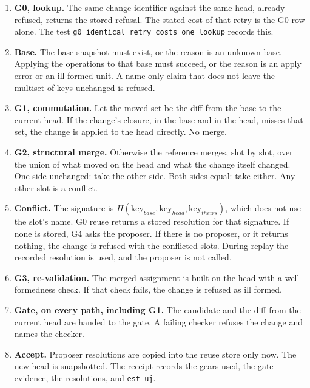 \documentclass[10pt,letterpaper]{article}
\newcounter{none}
\providecommand{\tightlist}{\setlength{\itemsep}{1pt}\setlength{\parskip}{0pt}}
\begin{document}
\begin{enumerate}
\def\labelenumi{\arabic{enumi}.}
\tightlist
\item
  \textbf{G0, lookup.} The same change identifier against the same head,
  already refused, returns the stored refusal. The stated cost of that
  retry is the G0 row alone. The test
  \texttt{g0\_\allowbreak{}identical\_\allowbreak{}retry\_\allowbreak{}costs\_\allowbreak{}one\_\allowbreak{}lookup} records this.
\item
  \textbf{Base.} The base snapshot must exist, or the reason is an
  unknown base. Applying the operations to that base must succeed, or
  the reason is an apply error or an ill-formed unit. A name-only claim
  that does not leave the multiset of keys unchanged is refused.
\item
  \textbf{G1, commutation.} Let the moved set be the diff from the base
  to the current head. If the change's closure, in the base and in the
  head, misses that set, the change is applied to the head directly. No
  merge.
\item
  \textbf{G2, structural merge.} Otherwise the reference merges, slot by
  slot, over the union of what moved on the head and what the change
  itself changed. One side unchanged: take the other side. Both sides
  equal: take either. Any other slot is a conflict.
\item
  \textbf{Conflict.} The signature is
  \(H(\mathrm{key}_{base}, \mathrm{key}_{head}, \mathrm{key}_{theirs})\),
  which does not use the slot's name. G0 reuse returns a stored
  resolution for that signature. If none is stored, G4 asks the
  proposer. If there is no proposer, or it returns nothing, the change
  is refused with the conflicted slots. During replay the recorded
  resolution is used, and the proposer is not called.
\item
  \textbf{G3, re-validation.} The merged assignment is built on the head
  with a well-formedness check. If that check fails, the change is
  refused as ill formed.
\item
  \textbf{Gate, on every path, including G1.} The candidate and the diff
  from the current head are handed to the gate. A failing checker
  refuses the change and names the checker.
\item
  \textbf{Accept.} Proposer resolutions are copied into the reuse store
  only now. The new head is snapshotted. The receipt records the gears
  used, the gate evidence, the resolutions, and \texttt{est\_uj}.
\end{enumerate}
\end{document}
